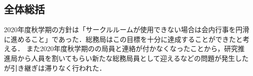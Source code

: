 \subsection*{全体総括}

2020年度秋学期の方針は「サークルルームが使用できない場合は会内行事を円滑に進めること」であった．総務局はこの目標を十分に達成することができたと考える．
また2020年度秋学期の\firstGrade{}の局員と連絡が付かなくなったことから，研究推進局から人員を割いてもらい新たな総務局員として迎えるなどの問題が発生したが引き継ぎは滞りなく行われた．

